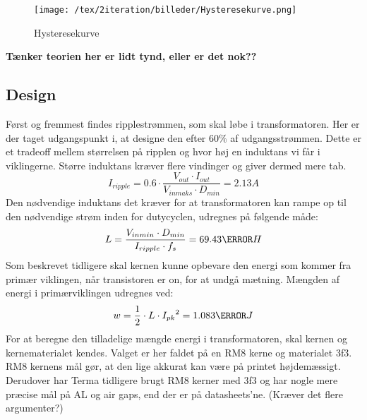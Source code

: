 \begin{figure}[H]
	\center
	\texttt{[image: /tex/2iteration/billeder/Hysteresekurve.png]}
	\caption{Hysteresekurve}
	\label{fig: Hysteresekurve}
\end{figure}
\textbf{Tænker teorien her er lidt tynd, eller er det nok??}

\subsection{Design}
Først og fremmest findes ripplestrømmen, som skal løbe i transformatoren. Her er der taget udgangspunkt i, at designe den efter $60\percent$ af udgangsstrømmen. Dette er et tradeoff mellem størrelsen på ripplen og hvor høj en induktans vi får i viklingerne. Større induktans kræver flere vindinger og giver dermed mere tab.
\begin{equation} \label{I_ripple_CCM}
I_{ripple} = 0.6 \cdot \frac{V_{out} \cdot I_{out}}{V_{inmaks} \cdot   D_{min}} = 2.13A
\end{equation}
Den nødvendige induktans det kræver for at transformatoren kan rampe op til den nødvendige strøm inden for dutycyclen, udregnes på følgende måde:
\begin{equation} \label{L_CCM}
L = \frac{V_{inmin} \cdot D_{min}}{I_{ripple} \cdot f_s} = 69.43\micro H
\end{equation}
Som beskrevet tidligere skal kernen kunne opbevare den energi som kommer fra primær viklingen, når transistoren er on, for at undgå mætning. Mængden af energi i primærviklingen udregnes ved:
\begin{equation} \label{Primary_energy}
w = \frac{1} {2} \cdot L \cdot {I_{pk}}^2 = 1.083\milli J
\end{equation}
For at beregne den tilladelige mængde energi i transformatoren, skal kernen og kernematerialet kendes. Valget er her faldet på en RM8 kerne og materialet 3f3. RM8 kernens mål gør, at den lige akkurat kan være på printet højdemæssigt. Derudover har Terma tidligere brugt RM8 kerner med 3f3 og har nogle mere præcise mål på AL og air gaps, end der er på datasheets’ne. (Kræver det flere argumenter?)


